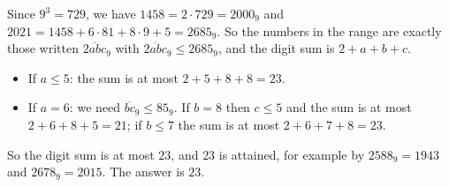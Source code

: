 Since $9^3=729$, we have $1458=2\cdot729=2000_9$ and $2021=1458+6\cdot81+8\cdot9+5=2685_9$. So the numbers in the range are exactly those written $\overline{2abc}_9$ with $\overline{2abc}_9\le2685_9$, and the digit sum is $2+a+b+c$.
\begin{itemize}
\item If $a\le5$: the sum is at most $2+5+8+8=23$.
\item If $a=6$: we need $\overline{bc}_9\le85_9$. If $b=8$ then $c\le5$ and the sum is at most $2+6+8+5=21$; if $b\le7$ the sum is at most $2+6+7+8=23$.
\end{itemize}
So the digit sum is at most $23$, and $23$ is attained, for example by $2588_9=1943$ and $2678_9=2015$. The answer is $\boxed{23}$.
